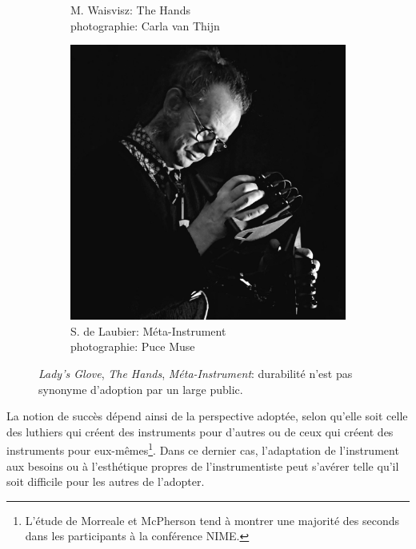 \begin{figure}[!htbp]
{\begin{subfigure}[b]{.35\textwidth}
			\caption[Michel Waisvisz et The Hands v2]{M. Waisvisz: The Hands\\ photographie: Carla van Thijn}
			\label{fig:ephemeral:Waisvisz_TheHands}
		\end{subfigure}%
		\begin{subfigure}[b]{.35\textwidth}
			\centering
			\includegraphics[width=.98\textwidth]{gfx/02_ephemeral/DeLaubier-MI4.jpg}
			\caption[Serge de Laubier et le Méta-Instrument 4]{S. de Laubier: Méta-Instrument\\ photographie: Puce Muse}
			\label{fig:ephemeral:DeLaubier_MI4}
		\end{subfigure}%
	}
	\caption[Lady's Glove, The Hands, Méta-Instrument: durabilité vs. adoption]{\textit{Lady's Glove}, \textit{The Hands}, \textit{Méta-Instrument}: durabilité n'est pas synonyme d'adoption par un large public.}
\end{figure}
\indent La notion de succès dépend ainsi de la perspective adoptée, selon qu'elle soit celle des luthiers qui créent des instruments pour d'autres ou de ceux qui créent des instruments pour eux-mêmes\footnote{L'étude de Morreale et McPherson \cite{morreale_design_2017} tend à montrer une majorité des seconds dans les participants à la conférence \gls{NIME}.}. Dans ce dernier cas, l'adaptation de l'instrument aux besoins ou à l'esthétique propres de l'instrumentiste peut s'avérer telle qu'il soit difficile pour les autres de l'adopter.\\
